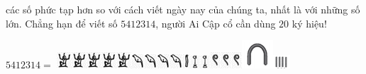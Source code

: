 \begin{multicols}{2}
các số phức tạp hơn so với cách viết ngày nay của chúng ta, nhất là với những số lớn. Chẳng hạn để viết số $5412314$, người Ai Cập cổ cần dùng $20$ ký hiệu!
	\begin{center}
		$5412314   =$ \includegraphics[scale=0.85]{7}\includegraphics[scale=0.85]{7}\includegraphics[scale=0.85]{7}\includegraphics[scale=0.85]{7}\includegraphics[scale=0.85]{7}\includegraphics[scale=0.85]{8}\includegraphics[scale=0.85]{8}\includegraphics[scale=0.85]{8}\includegraphics[scale=0.85]{8}\includegraphics[scale=0.85]{9}\includegraphics[scale=0.85]{10}\includegraphics[scale=0.85]{10}\includegraphics[scale=0.85]{11}\includegraphics[scale=0.85]{11}\includegraphics[scale=0.85]{11}\includegraphics[scale=0.85]{5}\includegraphics[scale=0.85]{3}

\end{center}
\end{multicols}
